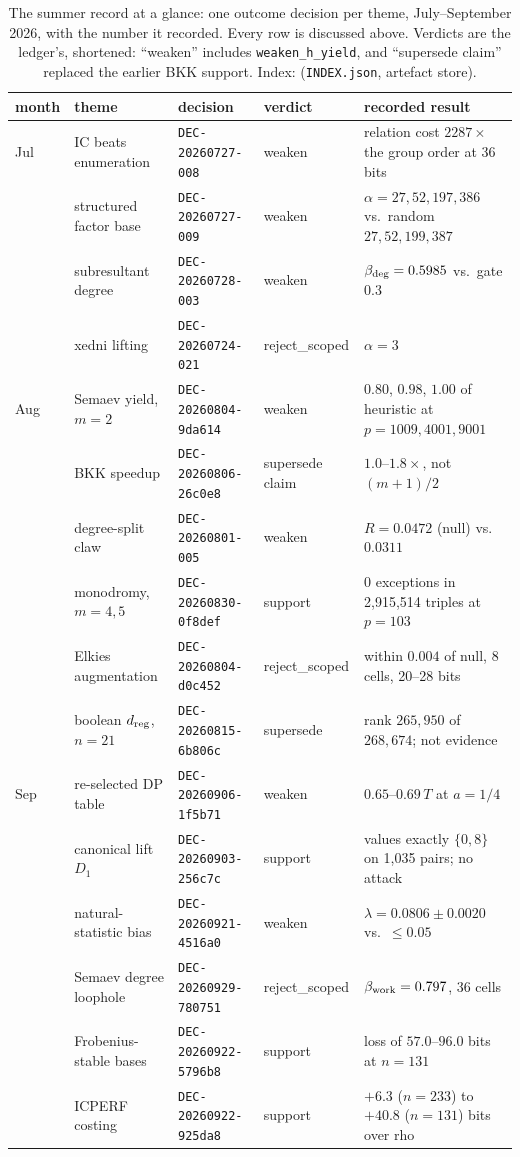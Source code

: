 \begin{table}[p]
\centering\small
\setlength{\tabcolsep}{4pt}
\begin{tabular}{@{}llllp{4.6cm}@{}}
\toprule
month & theme & decision & verdict & recorded result \\
\midrule
Jul & IC beats enumeration & \texttt{DEC-20260727-008} & weaken & relation cost $2287\times$ the group order at 36 bits \\
    & structured factor base & \texttt{DEC-20260727-009} & weaken & $\alpha=27,52,197,386$ vs.\ random $27,52,199,387$ \\
    & subresultant degree & \texttt{DEC-20260728-003} & weaken & $\beta_{\rm deg}=0.5985$ vs.\ gate $0.3$ \\
    & xedni lifting & \texttt{DEC-20260724-021} & reject\_scoped & $\alpha=3$ \\
\addlinespace
Aug & Semaev yield, $m=2$ & \texttt{DEC-20260804-9da614} & weaken & $0.80$, $0.98$, $1.00$ of heuristic at $p=1009,4001,9001$ \\
    & BKK speedup & \texttt{DEC-20260806-26c0e8} & supersede claim & $1.0$--$1.8\times$, not $(m+1)/2$ \\
    & degree-split claw & \texttt{DEC-20260801-005} & weaken & $R=0.0472$ (null) vs.\ $0.0311$ \\
    & monodromy, $m=4,5$ & \texttt{DEC-20260830-0f8def} & support & 0 exceptions in 2{,}915{,}514 triples at $p=103$ \\
    & Elkies augmentation & \texttt{DEC-20260804-d0c452} & reject\_scoped & within $0.004$ of null, 8 cells, 20--28 bits \\
    & boolean $d_{\rm reg}$, $n=21$ & \texttt{DEC-20260815-6b806c} & supersede & rank $265{,}950$ of $268{,}674$; not evidence \\
\addlinespace
Sep & re-selected DP table & \texttt{DEC-20260906-1f5b71} & weaken & $0.65$--$0.69\,T$ at $a=1/4$ \\
    & canonical lift $D_1$ & \texttt{DEC-20260903-256c7c} & support & values exactly $\{0,8\}$ on 1{,}035 pairs; no attack \\
    & natural-statistic bias & \texttt{DEC-20260921-4516a0} & weaken & $\lambda=0.0806\pm0.0020$ vs.\ $\le0.05$ \\
    & Semaev degree loophole & \texttt{DEC-20260929-780751} & reject\_scoped & $\beta_{\rm work}=0.797$, 36 cells \\
    & Frobenius-stable bases & \texttt{DEC-20260922-5796b8} & support & loss of $57.0$--$96.0$ bits at $n=131$ \\
    & ICPERF costing & \texttt{DEC-20260922-925da8} & support & $+6.3$ ($n=233$) to $+40.8$ ($n=131$) bits over rho \\
\bottomrule
\end{tabular}
\caption[]{The summer record at a glance: one outcome decision per theme,
July--September 2026, with the number it recorded. Every row is
discussed above. Verdicts are the ledger's, shortened: ``weaken'' includes
\texttt{weaken\_h\_yield}, and ``supersede claim'' replaced the earlier
BKK support. Index:  (\texttt{INDEX.json}, artefact store).}
\label{tab:summer}
\end{table}

